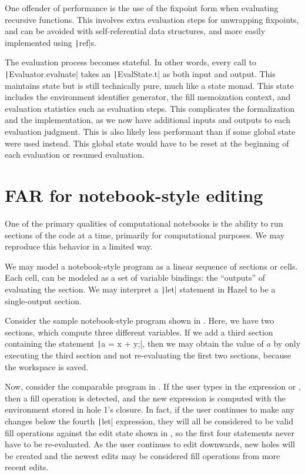 One offender of performance is the use of the fixpoint form when evaluating recursive functions. This involves extra evaluation steps for unwrapping fixpoints, and can be avoided with self-referential data structures, and more easily implemented using \texttt|ref|s.

The evaluation process becomes stateful. In other words, every call to \texttt|Evaluator.evaluate| takes an \texttt|EvalState.t| as both input and output. This maintains state but is still technically pure, much like a state monad. This state includes the environment identifier generator, the fill memoization context, and evaluation statistics such as evaluation steps. This complicates the formalization and the implementation, as we now have additional inputs and outputs to each evaluation judgment. This is also likely less performant than if some global state were used instead. This global state would have to be reset at the beginning of each evaluation or resumed evaluation.

\section{FAR for notebook-style editing}
\label{sec:notebook-ui}

One of the primary qualities of computational notebooks is the ability to run sections of the code at a time, primarily for computational purposes. We may reproduce this behavior in a limited way.

We may model a notebook-style program as a linear sequence of sections or cells. Each cell, can be modeled as a set of variable bindings: the ``outputs'' of evaluating the section. We may interpret a \texttt|let| statement in Hazel to be a single-output section.

Consider the sample notebook-style program shown in . Here, we have two sections, which compute three different variables. If we add a third section containing the statement \texttt|a = x + y;|, then we may obtain the value of $a$ by only executing the third section and not re-evaluating the first two sections, because the workspace is saved.

Now, consider the comparable program in . If the user types in the expression  or , then a fill operation is detected, and the new expression is computed with the environment stored in hole 1's closure. In fact, if the user continues to make any changes below the fourth \texttt|let| expression, they will all be considered to be valid fill operations against the edit state shown in , so the first four statements never have to be re-evaluated. As the user continues to edit downwards, new holes will be created and the newest edits may be considered fill operations from more recent edits.


